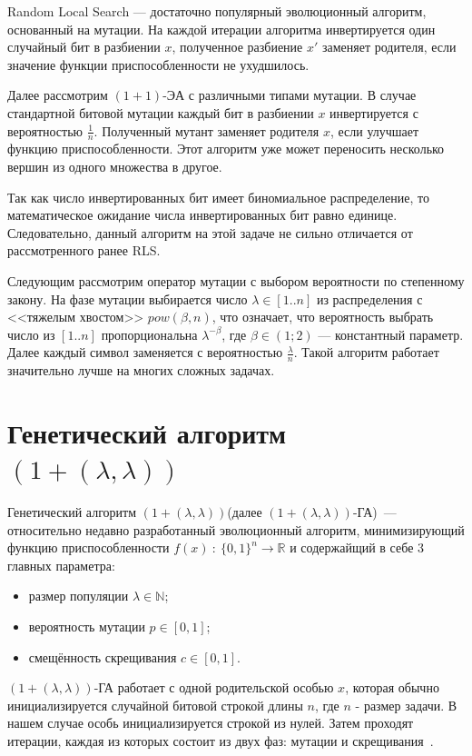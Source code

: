 \documentclass[times]{itmo-student-thesis}
\newcommand{\alglambda}{${(1 + (\lambda , \lambda))}$\xspace}
\newcommand{\alglambdaf}{${(1 + (\lambda , \lambda))}$-ГА\xspace}
\newcommand{\oea}{\mbox{$(1 + 1)$-ЭА}\xspace}
\newcommand{\N}{{\mathbb N}}
\newcommand{\R}{{\mathbb R}}
\begin{document}
Random Local Search --- достаточно популярный эволюционный алгоритм, основанный на мутации. На каждой итерации алгоритма инвертируется один случайный бит в разбиении $x$, полученное разбиение $x'$ заменяет родителя, если значение функции приспособленности не ухудшилось.

Далее рассмотрим \oea с различными типами мутации. В случае стандартной битовой мутации каждый бит в разбиении $x$ инвертируется с вероятностью $\frac{1}{n}$.
Полученный мутант заменяет родителя $x$, если улучшает функцию приспособленности.
Этот алгоритм уже может переносить несколько вершин из одного множества в другое.

Так как число инвертированных бит имеет биномиальное распределение, то математическое ожидание числа инвертированных бит равно единице.
Следовательно, данный алгоритм на этой задаче не сильно отличается от рассмотренного ранее RLS.

Следующим рассмотрим оператор мутации с выбором вероятности по степенному закону. На фазе мутации выбирается число $\lambda \in [1..n]$ из распределения с <<тяжелым хвостом>> $pow(\beta, n)$, что означает, что  вероятность выбрать число из $[1..n]$ пропорциональна $\lambda^{-\beta}$, где $\beta \in (1; 2)$ --- константный параметр.
Далее каждый символ заменяется с вероятностью $\frac{\lambda}{n}$. Такой алгоритм работает значительно лучше на многих сложных задачах.

\section{Генетический алгоритм \alglambda}

Генетический алгоритм \alglambda(далее \alglambdaf)~--- относительно недавно разработанный эволюционный алгоритм, минимизирующий функцию приспособленности $f(x)~:~\{0, 1\}^n \rightarrow \R$ и содержайщий в себе 3 главных параметра:
\begin{itemize}
   \item размер популяции $\lambda \in \N$;
   \item вероятность мутации $p \in [0, 1]$;
   \item смещённость скрещивания $c \in [0, 1]$.
\end{itemize}
\alglambdaf работает с одной родительской особью $x$, которая обычно инициализируется случайной битовой строкой длины $n$, где $n$ - размер задачи. В нашем случае особь инициализируется строкой из нулей. Затем проходят итерации, каждая из которых состоит из двух фаз: мутации и скрещивания~\cite{DoerrDE15}.
\end{document}
